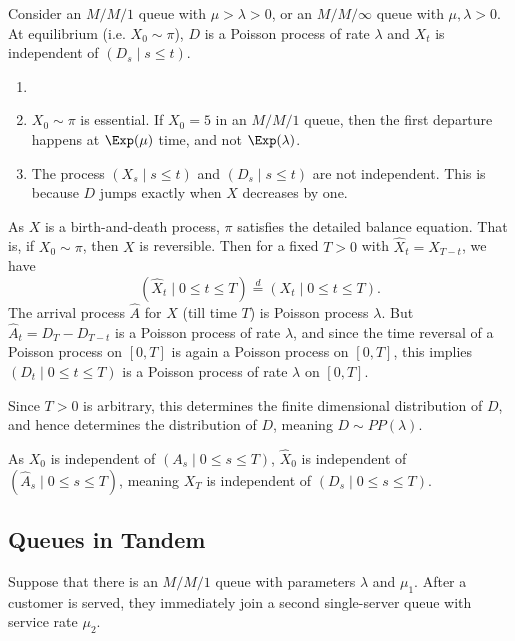 \documentclass[12pt]{article}
\begin{document}
\begin{theorem}[Burke]
	Consider an $M/M/1$ queue with $\mu > \lambda > 0$, or an $M/M/\infty$ queue with $\mu, \lambda > 0$. At equilibrium (i.e. $X_0 \sim \pi$), $D$ is a Poisson process of rate $\lambda$ and $X_t$ is independent of $(D_s \mid s \leq t)$.
\end{theorem}

\begin{remark}
	\begin{enumerate}
		\item[]
		\item $X_0 \sim \pi$ is essential. If $X_0 = 5$ in an $M/M/1$ queue, then the first departure happens at $\Exp(\mu)$ time, and not $\Exp(\lambda)$.
		\item The process $(X_s \mid s \leq t)$ and $(D_s \mid s \leq t)$ are not independent. This is because $D$ jumps exactly when $X$ decreases by one.
	\end{enumerate}
\end{remark}

\begin{proofbox}
	As $X$ is a birth-and-death process, $\pi$ satisfies the detailed balance equation. That is, if $X_0 \sim \pi$, then $X$ is reversible. Then for a fixed $T > 0$ with $\hat X_t = X_{T-t}$, we have
	\[
		(\hat X_t \mid 0 \leq t \leq T) \overset{d}{=} (X_t \mid 0 \leq t \leq T).
	\]
	The arrival process $\hat A$ for $\hat X$ (till time $T$) is Poisson process $\lambda$. But $\hat A_t = D_T - D_{T - t}$ is a Poisson process of rate $\lambda$, and since the time reversal of a Poisson process on $[0,T]$ is again a Poisson process on $[0,T]$, this implies $(D_t \mid 0 \leq t \leq T)$ is a Poisson process of rate $\lambda$ on $[0,T]$.

	Since $T > 0$ is arbitrary, this determines the finite dimensional distribution of $D$, and hence determines the distribution of $D$, meaning $D \sim PP(\lambda)$.

	As $X_0$ is independent of $(A_s \mid 0 \leq s \leq T)$, $\hat X_0$ is independent of $(\hat A_s \mid 0 \leq s \leq T)$, meaning $X_T$ is independent of $(D_s \mid 0 \leq s \leq T)$.
\end{proofbox}

\subsection{Queues in Tandem}
\label{sub:queues_in_tandem}

Suppose that there is an $M/M/1$ queue with parameters $\lambda$ and $\mu_1$. After a customer is served, they immediately join a second single-server queue with service rate $\mu_2$.
\end{document}
